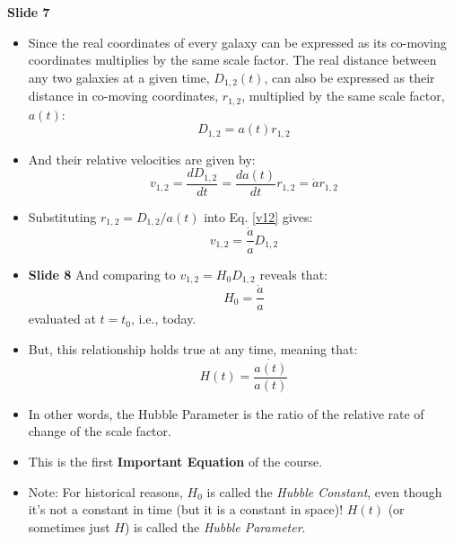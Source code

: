 \documentclass[11pt]{article}
\begin{document}
\vspace{3mm}
\noindent
{\bf Slide 7}
\begin{itemize}
\item Since the real coordinates of every galaxy can be expressed as its co-moving coordinates multiplies by the same scale factor. The real distance between any two galaxies at a given time, $D_{1,2}(t)$, can also be expressed as their distance in co-moving coordinates, $r_{1,2}$,  multiplied by the same scale factor, $a(t)$:
\begin{equation}
D_{1,2} = a(t)r_{1,2}
\end{equation}
\item And their relative velocities are given by:
\begin{equation}
  \label{v12}
  v_{1,2} = \frac{dD_{1,2}}{dt} = \frac{da(t)}{dt}r_{1,2} = \dot{a}r_{1,2}
\end{equation}
\item Substituting $r_{1,2} = D_{1,2}/a(t)$ into Eq. \ref{v12} gives: 
\begin{equation}
  v_{1,2} = \frac{\dot{a}}{a}D_{1,2}
\end{equation}
\item {\bf Slide 8} And comparing to $v_{1,2}=H_0D_{1,2}$ reveals that: 
\begin{equation}
  H_0 = \frac{\dot{a}}{a}
\end{equation}
evaluated at $t=t_0$, i.e., today.
\item But, this relationship holds true at any time, meaning that:
\begin{equation}
  H(t) = \frac{\dot{a(t)}}{a(t)}
\end{equation}
\item In other words, the Hubble Parameter is the ratio of the relative rate of change of the scale factor.
\item This is the first {\bf Important Equation} of the course.
\item Note: For historical reasons, $H_0$ is called the {\it Hubble Constant}, even though it's not a constant in time (but it is a constant in space)! $H(t)$ (or sometimes just $H$) is called the {\it Hubble Parameter}.  
\end{itemize}
\end{document}
